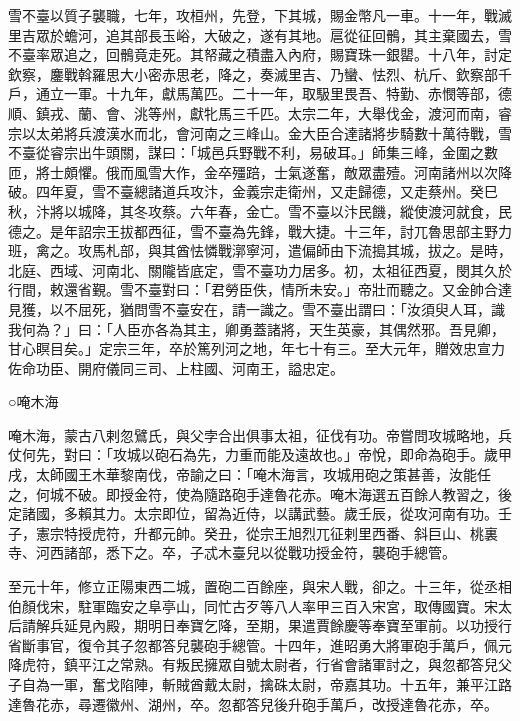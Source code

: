 \begin{pinyinscope}
 雪不臺以質子襲職，七年，攻桓州，先登，下其城，賜金幣凡一車。十一年，戰滅里吉眾於蟾河，追其部長玉峪，大破之，遂有其地。扈從征回鶻，其主棄國去，雪不臺率眾追之，回鶻竟走死。其帑藏之積盡入內府，賜寶珠一銀罌。十八年，討定欽察，鏖戰斡羅思大小密赤思老，降之，奏滅里吉、乃蠻、怯烈、杭斤、欽察部千戶，通立一軍。十九年，獻馬萬匹。二十一年，取馺里畏吾、特勤、赤憫等部，德順、鎮戎、蘭、會、洮等州，獻牝馬三千匹。太宗二年，大舉伐金，渡河而南，睿宗以太弟將兵渡漢水而北，會河南之三峰山。金大臣合達諸將步騎數十萬待戰，雪不臺從睿宗出牛頭關，謀曰：「城邑兵野戰不利，易破耳。」師集三峰，金圍之數匝，將士頗懼。俄而風雪大作，金卒殭踣，士氣遂奮，敵眾盡殪。河南諸州以次降破。四年夏，雪不臺總諸道兵攻汴，金義宗走衛州，又走歸德，又走蔡州。癸巳秋，汴將以城降，其冬攻蔡。六年春，金亡。雪不臺以汴民饑，縱使渡河就食，民德之。是年詔宗王拔都西征，雪不臺為先鋒，戰大捷。十三年，討兀魯思部主野力班，禽之。攻馬札部，與其酋怯憐戰漷寧河，遣偏師由下流搗其城，拔之。是時，北庭、西域、河南北、關隴皆底定，雪不臺功力居多。初，太祖征西夏，閔其久於行間，敕還省覲。雪不臺對曰：「君勞臣佚，情所未安。」帝壯而聽之。又金帥合達見獲，以不屈死，猶問雪不臺安在，請一識之。雪不臺出謂曰：「汝須臾人耳，識我何為？」曰：「人臣亦各為其主，卿勇蓋諸將，天生英豪，其偶然邪。吾見卿，甘心瞑目矣。」定宗三年，卒於篤列河之地，年七十有三。至大元年，贈效忠宣力佐命功臣、開府儀同三司、上柱國、河南王，謚忠定。



 ○唵木海



 唵木海，蒙古八剌忽鷿氏，與父孛合出俱事太祖，征伐有功。帝嘗問攻城略地，兵仗何先，對曰：「攻城以砲石為先，力重而能及遠故也。」帝悅，即命為砲手。歲甲戌，太師國王木華黎南伐，帝諭之曰：「唵木海言，攻城用砲之策甚善，汝能任之，何城不破。即授金符，使為隨路砲手達魯花赤。唵木海選五百餘人教習之，後定諸國，多賴其力。太宗即位，留為近侍，以講武藝。歲壬辰，從攻河南有功。壬子，憲宗特授虎符，升都元帥。癸丑，從宗王旭烈兀征剌里西番、斜巨山、桃裏寺、河西諸部，悉下之。卒，子忒木臺兒以從戰功授金符，襲砲手總管。



 至元十年，修立正陽東西二城，置砲二百餘座，與宋人戰，卻之。十三年，從丞相伯顏伐宋，駐軍臨安之阜亭山，同忙古歹等八人率甲三百入宋宮，取傳國寶。宋太后請解兵延見內殿，期明日奉寶乞降，至期，果遣賈餘慶等奉寶至軍前。以功授行省斷事官，復令其子忽都答兒襲砲手總管。十四年，進昭勇大將軍砲手萬戶，佩元降虎符，鎮平江之常熟。有叛民擁眾自號太尉者，行省會諸軍討之，與忽都答兒父子自為一軍，奮戈陷陣，斬賊酋戴太尉，擒硃太尉，帝嘉其功。十五年，兼平江路達魯花赤，尋遷徽州、湖州，卒。忽都答兒後升砲手萬戶，改授達魯花赤，卒。




\end{pinyinscope}
